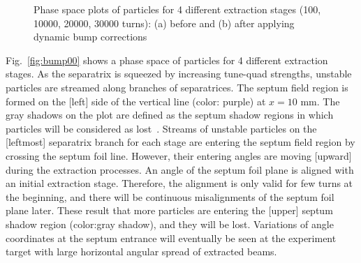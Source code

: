 \documentclass[aps,prstab,onecolumn,preprint,endfloats]{revtex4-1}
\begin{document}
\begin{figure}[!htbp]
  \caption{\label{fig:bump0}Phase space plots of particles for 4 different extraction stages (100, 10000, 20000, 30000 turns): (a) before and (b) after applying dynamic bump corrections}
\end{figure}

Fig.~\ref{fig:bump00} shows a phase space of particles for 4 different extraction stages.
As the separatrix is squeezed by increasing tune-quad strengths, unstable particles are streamed along branches of separatrices. 
The septum field region is formed on the [left] side of the vertical line (color: purple) at $x=10$ mm. 
The gray shadows on the plot are defined as the septum shadow regions in which particles will be considered as lost~\cite{m.pullia}.
Streams of unstable particles on the [leftmost] separatrix branch for each stage are entering the septum field region by crossing the septum foil line.
However, their entering angles are moving [upward] during the extraction processes.
An angle of the septum foil plane is aligned with an initial extraction stage.
Therefore, the alignment is only valid for few turns at the beginning, and there will be continuous misalignments of the septum foil plane later.
These result that more particles are entering the [upper] septum shadow region (color:gray shadow), and they will be lost.
Variations of angle coordinates at the septum entrance will eventually be seen at the experiment target with large horizontal angular spread of extracted beams.
\end{document}
